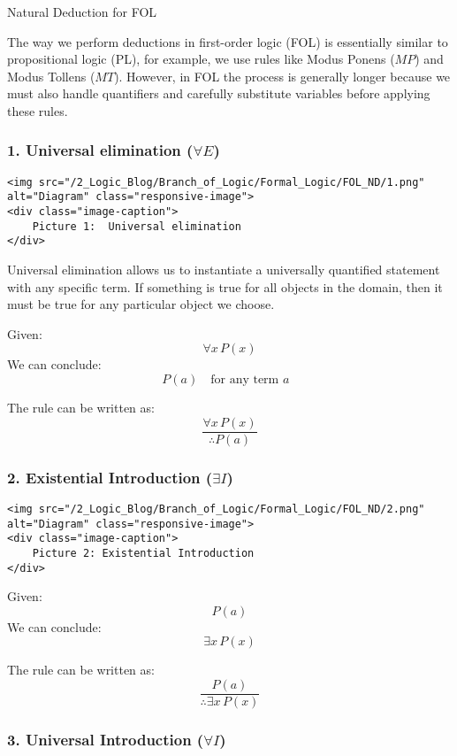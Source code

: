 Natural Deduction for FOL

The way we perform deductions in first-order logic (FOL) is essentially
similar to propositional logic (PL), for example, we use rules like
Modus Ponens (\(MP\)) and Modus Tollens (\(MT\)). However, in FOL the
process is generally longer because we must also handle quantifiers and
carefully substitute variables before applying these rules.

\subsubsection{\texorpdfstring{1. Universal elimination
(\(\forall E\))}{1. Universal elimination (\textbackslash forall E)}}\label{universal-elimination-forall-e}

\begin{verbatim}
<img src="/2_Logic_Blog/Branch_of_Logic/Formal_Logic/FOL_ND/1.png" alt="Diagram" class="responsive-image">
<div class="image-caption">
    Picture 1:  Universal elimination
</div>
\end{verbatim}

Universal elimination allows us to instantiate a universally quantified
statement with any specific term. If something is true for all objects
in the domain, then it must be true for any particular object we choose.

Given: \[\forall x\, P(x)\] We can conclude:
\[P(a)  \quad \text{for any term $a$ } \]

The rule can be written as: \[\frac{\forall x\, P(x)}{\therefore P(a)}\]

\subsubsection{\texorpdfstring{2. Existential Introduction
(\(\exists I\))}{2. Existential Introduction (\textbackslash exists I)}}\label{existential-introduction-exists-i}

\begin{verbatim}
<img src="/2_Logic_Blog/Branch_of_Logic/Formal_Logic/FOL_ND/2.png" alt="Diagram" class="responsive-image">
<div class="image-caption">
    Picture 2: Existential Introduction
</div>
\end{verbatim}

Given: \[P(a)\] We can conclude: \[\exists x\, P(x)\]

The rule can be written as: \[\frac{P(a)}{\therefore \exists x\, P(x)}\]

\subsubsection{\texorpdfstring{3. Universal Introduction
(\(\forall I\))}{3. Universal Introduction (\textbackslash forall I)}}\label{universal-introduction-forall-i}

